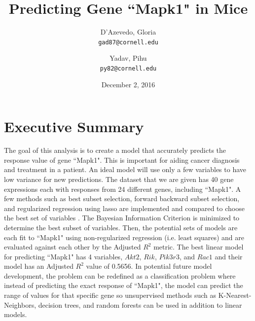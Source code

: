 \documentclass{article}
\title{Predicting Gene ``Mapk1" in Mice}
\author{
  D'Azevedo, Gloria\\
  \texttt{gad87@cornell.edu}
  \and
  Yadav, Pihu\\
  \texttt{py82@cornell.edu}
}
\date{December 2, 2016}
\begin{document}
\maketitle

\tableofcontents

\section{Executive Summary}
The goal of this analysis is to create a model that accurately predicts the response value of gene ``Mapk1".  This is important for aiding cancer diagnosis and treatment in a patient.  An ideal model will use only a few variables to have low variance for new predictions.  The dataset that we are given has 40 gene expressions each with responses from 24 different genes, including ``Mapk1".  A few methods such as best subset selection, forward backward subset selection, and regularized regression using lasso are implemented and compared to choose the best set of variables .  The Bayesian Information Criterion is minimized to determine the best subset of variables.  Then, the potential sets of models are each fit to ``Mapk1" using non-regularized regression (i.e. least squares) and are evaluated against each other by the Adjusted $R^2$ metric.  The best linear model for predicting ``Mapk1" has 4 variables, $Akt2$, $Rik$, $Pik3r3$, and $Rac1$ and their model has an Adjusted $R^2$ value of 0.5656.  In potential future model development, the problem can be redefined as a classification problem where instead of predicting the exact response of ``Mapk1", the model can predict the range of values for that specific gene so unsupervised methods such as K-Nearest-Neighbors, decision trees, and random forests can be used in addition to linear models.
\end{document}
